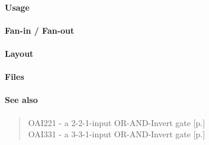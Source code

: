 \paragraph{Usage}

\paragraph{Fan-in / Fan-out}

\paragraph{Layout}

\paragraph{Files}

\paragraph{See also}
\begin{quote}
    OAI221 - a 2-2-1-input OR-AND-Invert gate [p.\pageref{OAI221}] \\
    OAI331 - a 3-3-1-input OR-AND-Invert gate [p.\pageref{OAI331}]
\end{quote}
